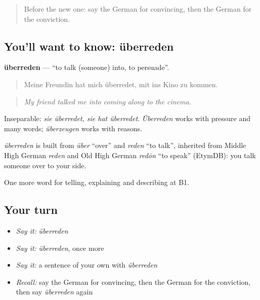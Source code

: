 \label{lesson:GE-C331-ueberreden}



\begin{quote}
Before the new one: say the German for convincing, then the German for the conviction.
\end{quote}

\subsection*{You'll want to know: überreden}
\textbf{überreden} — \textquotedblleft{}to talk (someone) into, to persuade\textquotedblright{}.

\begin{quote}
Meine Freundin hat mich überredet, mit ins Kino zu kommen.
\end{quote}

\begin{quote}
\emph{My friend talked me into coming along to the cinema.}
\end{quote}

Inseparable: \emph{sie überredet, sie hat überredet}. \emph{Überreden} works with pressure and many words; \emph{überzeugen} works with reasons.

\begin{cousinweb}
\emph{überreden} is built from \emph{über} \textquotedblleft{}over\textquotedblright{} and \emph{reden} \textquotedblleft{}to talk\textquotedblright{}, inherited from Middle High German \emph{reden} and Old High German \emph{redōn} \textquotedblleft{}to speak\textquotedblright{} (EtymDB): you talk someone over to your side.
\end{cousinweb}

\begin{grammarlens}[title={What you've built}]
One more word for telling, explaining and describing at B1.
\end{grammarlens}

\subsection*{Your turn}
\begin{itemize}
\raggedright
  \item \emph{Say it:} \emph{überreden}
  \item \emph{Say it:} \emph{überreden}, once more
  \item \emph{Say it:} a sentence of your own with \emph{überreden}
  \item \emph{Recall:} say the German for convincing, then the German for the conviction, then say \emph{überreden} again
\end{itemize}

